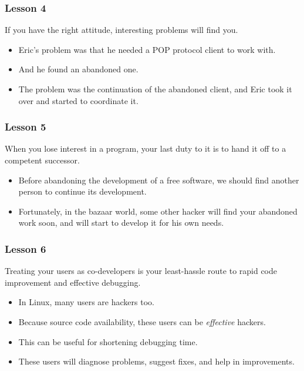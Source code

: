\documentclass{beamer}
\begin{document}
\begin{frame}
\frametitle{Lesson 4}

\begin{center}
{\large If you have the right attitude, interesting problems will find you.}
\end{center}

\begin{itemize}
\item Eric's problem was that he needed a POP protocol client to work
  with.
\item And he found an abandoned one.
\item The problem was the continuation of the abandoned client, and
  Eric took it over and started to coordinate it.
\end{itemize}

\end{frame}

\begin{frame}
\frametitle{Lesson 5}

\begin{center}
{\large When you lose interest in a program, your last duty to it is to hand it off to a competent successor.}
\end{center}

\begin{itemize}
\item Before abandoning the development of a free software,
  we should find another person to continue its development.
\item Fortunately, in the bazaar world, some other hacker will find
  your abandoned work soon, and will start to develop it for his own
  needs.
\end{itemize}

\end{frame}

\begin{frame}
\frametitle{Lesson 6}

\begin{center}
{\large Treating your users as co-developers is your least-hassle route to rapid code improvement and effective debugging.}
\end{center}

\begin{itemize}
\item In Linux, many users are hackers too.
\item Because source code availability, these users can be {\em
    effective} hackers.
\item This can be useful for shortening debugging time.
\item These users will diagnose problems, suggest fixes, and help in
  improvements.
\end{itemize}

\end{frame}
\end{document}

